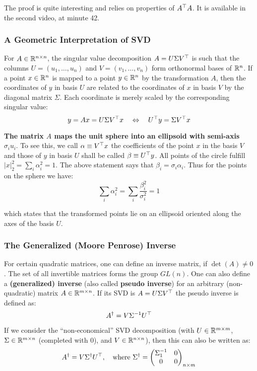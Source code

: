 The proof is quite interesting and relies on properties of $A^{\top}A$.
It is available in the second video, at minute 42.


\subsubsection{A Geometric Interpretation of SVD}%
\label{ssub:a_geometric_interpretation_of_svd}

For $A \in \mathbb{R}^{n \times{} n}$, the singular value decomposition
$A = U \Sigma V^{\top}$ is such that the columns $U = (u_1, \ldots, u_n)$
and $V = (v_1, \ldots, v_n)$ form orthonormal bases of $\mathbb{R}^n$.
If a point $x \in \mathbb{R}^n$ is mapped to a point $y \in \mathbb{R}^n$
by the transformation $A$, then the coordinates of $y$ in basis $U$
are related to the coordinates of $x$ in basis $V$
by the diagonal matrix $\Sigma$. Each coordinate is merely scaled by
the corresponding singular value:
\[y = Ax = U\Sigma V^{\top}x \quad \Leftrightarrow \quad U^{\top}y = \Sigma V^{\top}x\]

\textbf{The matrix $A$ maps the unit sphere into an ellipsoid with
semi-axis $\sigma_i u_i$}. To see this, we call $\alpha \equiv V^{\top}x$
the coefficients of the point $x$ in the basis $V$ and those of $y$
in basis $U$ shall be called $\beta \equiv U^{\top}y$.
All points of the circle fulfill $|x|^2_2 = \sum_i\alpha^2_i = 1$.
The above statement says that $\beta_i = \sigma_i\alpha_i$.
Thus for the points on the sphere we have:
	\[\sum_i\alpha^2_i = \sum_i\frac{\beta^2_i}{\sigma^2_i} = 1\]

which states that the transformed points lie on an ellipsoid
oriented along the axes of the basis $U$.


\subsubsection{The Generalized (Moore Penrose) Inverse}%
\label{ssub:the_generalized_moore_penrose_inverse}

For certain quadratic matrices, one can define an inverse matrix, if $\det(A) \ne 0$.
The set of all invertible matrices forms the group $GL(n)$.
One can also define a \textbf{(generalized) inverse}
(also called \textbf{pseudo inverse}) for an arbitrary (non-quadratic)
matrix $A \in \mathbb{R}^{m \times{} n}$. If its SVD is $A = U \Sigma V^{\top}$
the pseudo inverse is defined as:
	\[A^{\dagger} = V \Sigma^{-1} U^{\top}\]

If we consider the ``non-economical'' SVD decomposition
(with $U \in \mathbb{R}^{m \times{} m}$, $\Sigma \in \mathbb{R}^{m \times{} n}$ (completed with 0), and $V \in \mathbb{R}^{n \times{} n}$),
then this can also be written as:
	\[A^{\dagger} = V \Sigma^{\dagger} U^{\top}, \quad
		\text{where}\ \Sigma^{\dagger} =
		\begin{pmatrix}
			\Sigma_1^{-1} & 0 \\
			0 & 0
		\end{pmatrix}_{n \times m}\]

